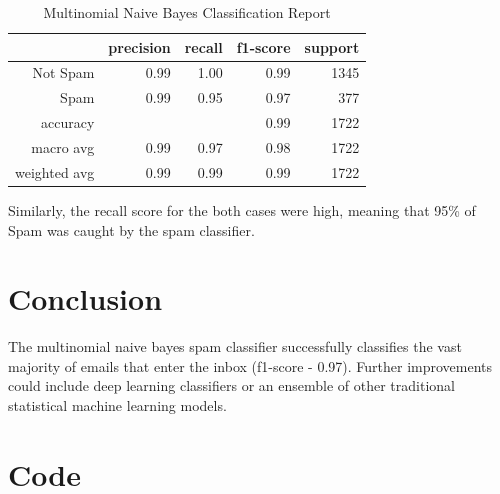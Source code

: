 \documentclass[10pt,a4paper]{article}
\begin{document}
\begin{table}[H]
\begin{center}
	\caption{Multinomial Naive Bayes Classification Report}
	\label{tab:a}
	\begin{tabular}{r r r r r}
		\hline
		& precision & recall & f1-score & support\\
		\hline
		Not Spam & 0.99 & 1.00 & 0.99 & 1345\\
		Spam & 0.99 & 0.95 & 0.97 & 377\\
		\hline\hline
		accuracy & & & 0.99 & 1722\\
		macro avg & 0.99 & 0.97 & 0.98 & 1722\\
		weighted avg & 0.99 & 0.99 & 0.99 & 1722\\
		\hline
	\end{tabular}
\end{center}
\end{table}

Similarly, the recall score for the both cases were high, meaning that 95\% of Spam was caught by the spam classifier.

\section{Conclusion}

The multinomial naive bayes spam classifier successfully classifies the vast majority of emails that enter the inbox (f1-score - 0.97). Further improvements could include deep learning classifiers or an ensemble of other traditional statistical machine learning models. 


\appendix

\section{Code}
\end{document}
